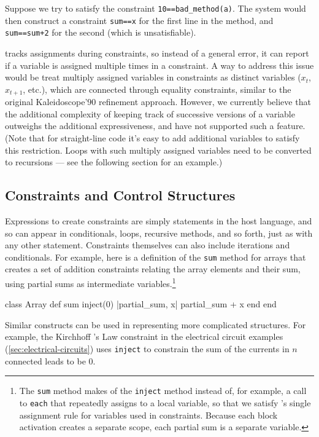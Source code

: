 Suppose we try to satisfy the constraint
\lstinline{10==bad_method(a)}. The system would then construct a
constraint \lstinline{sum==x} for the first line in the method, and
\lstinline{sum==sum+2} for the second (which is unsatisfiable).

\langname tracks assignments during constraints, so instead of a
general error, it can report if a variable is assigned multiple times
in a constraint.  A way to address this issue would be treat multiply
assigned variables in constraints as distinct variables (\eg $x_t$,
$x_{t+1}$, etc.), which are connected through equality constraints,
similar to the original Kaleidoscope'90 refinement approach.
However, we currently believe that the additional complexity of
keeping track of successive versions of a variable outweighs the
additional expressiveness, and have not supported such a feature.
(Note that for straight-line code it's easy to add additional variables
to satisfy this restriction.  Loops with such multiply assigned variables
need to be converted to recursions --- see the following section for
an example.)

\subsection{Constraints and Control Structures}

Expressions to create constraints are simply statements in the host
language, and so can appear in conditionals, loops, recursive methods,
and so forth, just as with any other statement.  Constraints
themselves can also include iterations and conditionals.  For example,
here is a definition of the \lstinline{sum} method for arrays that
creates a set of addition constraints relating the array elements and
their sum, using partial sums as intermediate variables.\footnote{The
  \lstinline{sum} method makes of the \lstinline{inject} method
  instead of, for example, a call to \lstinline{each} that repeatedly
  assigns to a local variable, so that we satisfy \langname's single
  assignment rule for variables used in constraints. Because each
  block activation creates a separate scope, each partial sum is a
  separate variable.}

\begin{code}
class Array
  def sum
    inject(0) { |partial_sum, x| partial_sum + x }
  end
end
\end{code}

Similar constructs can be used in representing more complicated
structures.  For example, the Kirchhoff 's Law constraint in the
electrical circuit examples (\autoref{sec:electrical-circuits}) uses
\lstinline{inject} to constrain the sum of the currents in $n$
connected leads to be 0.

